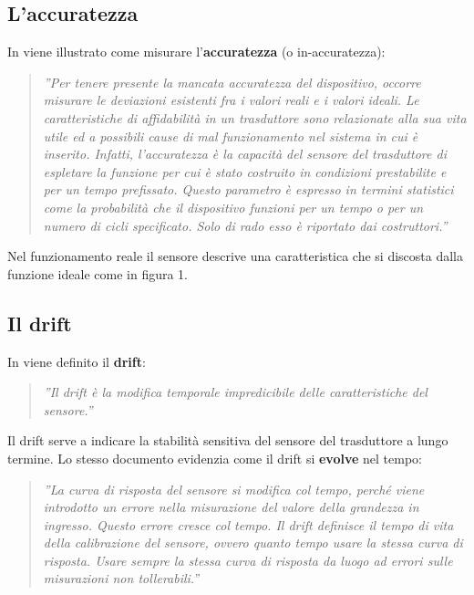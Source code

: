 \documentclass[a4paper]{report} %
\begin{document}
\subsection{L'accuratezza}
In \cite{art:rif.13} viene illustrato come misurare l'\textbf{accuratezza} (o in-accuratezza):
\begin{quote}
	\textit{''Per tenere presente la mancata accuratezza del dispositivo, occorre misurare le deviazioni esistenti fra i valori reali e i valori ideali. 
	Le caratteristiche di affidabilità in un trasduttore sono relazionate alla sua vita utile ed a possibili cause di mal funzionamento nel sistema in cui è inserito.
	Infatti, l'accuratezza è la capacità del sensore del trasduttore di espletare la funzione per cui è stato costruito in condizioni prestabilite e per un tempo prefissato. Questo parametro è espresso in termini statistici come la probabilità che il dispositivo funzioni per un tempo o per un numero di cicli specificato. Solo di rado esso è riportato dai costruttori.''}
\end{quote}
Nel funzionamento reale il sensore descrive una caratteristica che si discosta dalla funzione ideale come in figura 1.

\subsection{Il drift}
In \cite{art:rif.14} viene definito il \textbf{drift}:
\begin{quote}
	\textit{''Il drift è la modifica temporale impredicibile delle caratteristiche del sensore.''}  
\end{quote}
Il drift serve a indicare la stabilità sensitiva del sensore del trasduttore a lungo termine. Lo stesso documento evidenzia come il drift si \textbf{evolve} nel tempo:
\begin{quote}
	\textit{''La curva di risposta del sensore si modifica col tempo, perché viene introdotto un errore nella misurazione del valore della grandezza in ingresso. Questo errore cresce col tempo. Il drift definisce il tempo di vita della calibrazione del sensore, ovvero quanto tempo usare la stessa curva di risposta. Usare sempre la stessa curva di risposta da luogo ad errori sulle misurazioni non tollerabili.''}
\end{quote}
\end{document}
